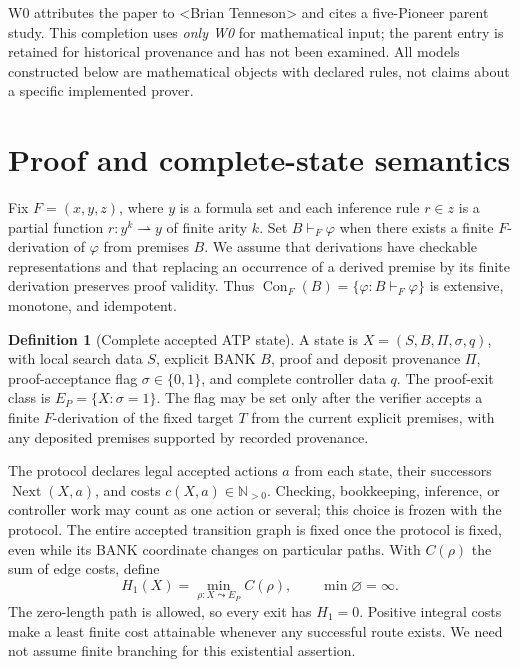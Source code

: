 \documentclass[11pt,letterpaper]{article}
\theoremstyle{definition}
\newtheorem{definition}[theorem]{Definition}
\theoremstyle{remark}
\newcommand{\Con}{\operatorname{Con}_{F}}
\newcommand{\Next}{\operatorname{Next}}
\newcommand{\Exit}{E_{P}}
\newcommand{\Hone}{H_{1}}
\newcommand{\AuthorTag}{\textless{}Brian Tenneson\textgreater{}}
\begin{document}
W0 attributes the paper to \AuthorTag{} and cites a five-Pioneer parent study. This completion uses \emph{only W0} for mathematical input; the parent entry is retained for historical provenance and has not been examined. All models constructed below are mathematical objects with declared rules, not claims about a specific implemented prover.

\section{Proof and complete-state semantics}
Fix $F=(x,y,z)$, where $y$ is a formula set and each inference rule $r\in z$ is a partial function $r:y^k\rightharpoonup y$ of finite arity $k$. Set $B\vdash_F\varphi$ when there exists a finite $F$-derivation of $\varphi$ from premises $B$. We assume that derivations have checkable representations and that replacing an occurrence of a derived premise by its finite derivation preserves proof validity. Thus $\Con(B)=\{\varphi:B\vdash_F\varphi\}$ is extensive, monotone, and idempotent.

\begin{definition}[Complete accepted ATP state]
A state is $X=(S,B,\Pi,\sigma,q)$, with local search data $S$, explicit BANK $B$, proof and deposit provenance $\Pi$, proof-acceptance flag $\sigma\in\{0,1\}$, and complete controller data $q$. The proof-exit class is $\Exit=\{X:\sigma=1\}$. The flag may be set only after the verifier accepts a finite $F$-derivation of the fixed target $T$ from the current explicit premises, with any deposited premises supported by recorded provenance.
\end{definition}

The protocol declares legal accepted actions $a$ from each state, their successors $\Next(X,a)$, and costs $c(X,a)\in\mathbb N_{>0}$. Checking, bookkeeping, inference, or controller work may count as one action or several; this choice is frozen with the protocol. The entire accepted transition graph is fixed once the protocol is fixed, even while its BANK coordinate changes on particular paths. With $C(\rho)$ the sum of edge costs, define
\begin{equation}\label{eq:B_H}
\Hone(X)=\min_{\rho:X\leadsto\Exit}C(\rho),\qquad \min\varnothing=\infty.
\end{equation}
The zero-length path is allowed, so every exit has $\Hone=0$. Positive integral costs make a least finite cost attainable whenever any successful route exists. We need not assume finite branching for this existential assertion.
\end{document}
